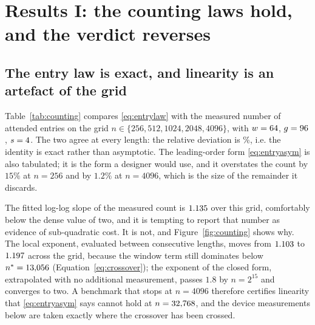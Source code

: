 \section{Results I: the counting laws hold, and the verdict reverses}\label{sec:attention}

\subsection{The entry law is exact, and linearity is an artefact of the grid}

Table~\ref{tab:counting} compares \eqref{eq:entrylaw} with the measured number of
attended entries on the grid $n\in\{256,512,1024,2048,4096\}$, with $w=\WinW$,
$g=\AnchorG$, $s=\Sinks$. The two agree at every length: the relative deviation is
\NnzLawMaxErrPct\%, i.e. the identity is exact rather than asymptotic. The
leading-order form \eqref{eq:entryasym} is also tabulated; it is the form a
designer would use, and it overstates the count by $15\%$ at $n=256$ and by
$1.2\%$ at $n=4096$, which is the size of the remainder it discards.

\begin{table}[t]
\centering

\caption{Entry law. Measured number of attended entries against the identity
\eqref{eq:entrylaw} and against its asymptotic form
$n(w+s)+(n-w)^2/(2g)$, with $w=\WinW$, $g=\AnchorG$, $s=\Sinks$. The identity is
exact on the whole grid, so the residual column is zero to three decimals; the
asymptotic form carries the stated remainder. The last column is the entry count as
a fraction of the causal matrix. Data:
\texttt{s1\_pswa/complexity\_curve.json}.}
\label{tab:counting}
\end{table}

The fitted log-log slope of the measured count is $1.135$ over this
grid, comfortably below the dense value of two, and it is tempting to report that
number as evidence of sub-quadratic cost. It is not, and
Figure~\ref{fig:counting} shows why. The local exponent, evaluated between
consecutive lengths, moves from $1.103$ to $1.197$
across the grid, because the window term still dominates below
$n^\ast=13{,}056$ (Equation~\eqref{eq:crossover}); the exponent of the closed
form, extrapolated with no additional measurement, passes $1.8$ by $n=2^{15}$ and
converges to two. A benchmark that stops at $n=4096$ therefore certifies
linearity that \eqref{eq:entryasym} says cannot hold at $n=32{,}768$, and the
device measurements below are taken exactly where the crossover has been crossed.

